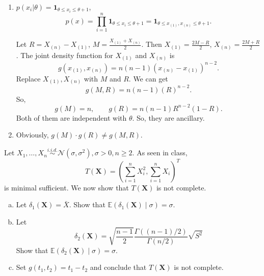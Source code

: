 \begin{solution}
    \begin{enumerate}
        \item $p(x_i|\theta)=\mathbf{1}_{\theta\leqslant x_i\leqslant \theta+1}$, 
        \[
            p(x)=\prod_{i=1}^n\mathbf{1}_{\theta\leqslant x_i\leqslant \theta+1}=\mathbf{1}_{\theta\leqslant x_{(1)}, x_{(n)}\leqslant \theta+1}. 
        \]
        
        Let $R=X_{(n)}-X_{(1)}$, $M=\frac{X_{(1)}+X_{(n)}}{2}$. Then $X_{(1)}=\frac{2M-R}{2}$, $X_{(n)}=\frac{2M+R}{2}$. The joint density function for $X_{(1)}$ and $X_{(n)}$ is 
        \[
            g(x_{(1)}, x_{(n)})=n(n-1)(x_{(n)}-x_{(1)})^{n-2}. 
        \]
        Replace $X_{(1)}, X_{(n)}$ with $M$ and $R$. We can get 
        \[
            g(M,R)=n(n-1)(R)^{n-2}. 
        \]
        So, \[
            g(M)=n, \qquad g(R)=n(n-1)R^{n-2}(1-R). 
        \]
        Both of them are independent with $\theta$. So, they are ancillary. 

        \item Obviously, $g(M)\cdot g(R)\neq g(M,R)$. 
    \end{enumerate}
    
\end{solution}

\begin{exercise}
    Let \(X_{1}, \ldots, X_{n} \stackrel{i.i.d. }{\sim} \mathcal{N}\left(\sigma, \sigma^{2}\right), \sigma>0, n \geq 2\). As seen in class,
\[
T(\mathbf{X})=\left(\sum_{i=1}^{n} X_{i}^{2}, \sum_{i=1}^{n} X_{i}\right)^{T}
\]
is minimal sufficient. We now show that \(T(\mathbf{X})\) is not complete. 
    \begin{enumerate}[(a)]
        \item Let \(\delta_{1}(\mathbf{X})=\bar{X}\). Show that \(\mathbb{E}\left(\delta_{1}(\mathbf{X}) \mid \sigma\right)=\sigma\). 
        \item Let
        \[
        \delta_{2}(\mathbf{X})=\sqrt{\frac{n-1}{2}} \frac{\Gamma((n-1) / 2)}{\Gamma(n / 2)} \sqrt{S^{2}}
        \]
        Show that \(\mathbb{E}\left(\delta_{2}(\mathbf{X}) \mid \sigma\right)=\sigma\). 
        \item Set \(g\left(t_{1}, t_{2}\right)=t_{1}-t_{2}\) and conclude that \(T(\mathbf{X})\) is not complete. 
    \end{enumerate}
\end{exercise}

